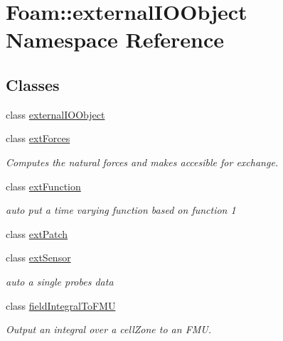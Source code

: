 \hypertarget{namespaceFoam_1_1externalIOObject}{}\section{Foam\+:\+:external\+I\+O\+Object Namespace Reference}
\label{namespaceFoam_1_1externalIOObject}
\subsection*{Classes}
\begin{DoxyCompactItemize}
\item 
class \hyperlink{classFoam_1_1externalIOObject_1_1externalIOObject}{external\+I\+O\+Object}
\item 
class \hyperlink{classFoam_1_1externalIOObject_1_1extForces}{ext\+Forces}
\begin{DoxyCompactList}\small\item\em Computes the natural forces and makes accesible for exchange. \end{DoxyCompactList}\item 
class \hyperlink{classFoam_1_1externalIOObject_1_1extFunction}{ext\+Function}
\begin{DoxyCompactList}\small\item\em auto put a time varying function based on function 1 \end{DoxyCompactList}\item 
class \hyperlink{classFoam_1_1externalIOObject_1_1extPatch}{ext\+Patch}
\item 
class \hyperlink{classFoam_1_1externalIOObject_1_1extSensor}{ext\+Sensor}
\begin{DoxyCompactList}\small\item\em auto a single probes data \end{DoxyCompactList}\item 
class \hyperlink{classFoam_1_1externalIOObject_1_1fieldIntegralToFMU}{field\+Integral\+To\+F\+MU}
\begin{DoxyCompactList}\small\item\em Output an integral over a cell\+Zone to an F\+MU. \end{DoxyCompactList}\end{DoxyCompactItemize}
